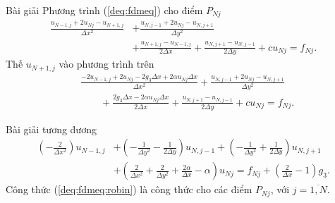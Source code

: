 \documentclass[9pt]{beamer}
\numberwithin{equation}{section}
\begin{document}
\begin{frame}
\begin{exampleblock}{Bài giải}
    Phương trình (\ref{deq:fdmeq}) cho điểm $P_{Nj}$
    \begin{align*}
        \frac{u_{N-1,j} + 2u_{Nj} - u_{N+1,j}}{\Delta x^2} &+
        \frac{u_{N,j-1} + 2u_{Nj} - u_{N,j+1}}{\Delta y^2} \\&+
        \frac{u_{N+1,j} - u_{N-1,j}}{2 \Delta x} +
        \frac{u_{N,j+1} - u_{N,j-1}}{2 \Delta y} +
        c u_{Nj} = f_{Nj}.
    \end{align*}
    Thế $u_{N+1,j}$ vào phương trình trên
    \begin{align*}
        &\frac{-2u_{N-1,j} + 2u_{Nj} - 2g_3 \Delta x + 2\alpha u_{Nj} \Delta x}{\Delta x^2} + \frac{u_{N,j-1} + 2u_{Nj} - u_{N,j+1}}{\Delta y^2} \\&\quad\quad +
        \frac{2g_3\Delta x - 2\alpha u_{Nj}\Delta x}{2\Delta x} +
        \frac{u_{N,j+1} - u_{N,j-1}}{2 \Delta y} +
        c u_{Nj} = f_{Nj}.
    \end{align*}
\end{exampleblock}
\end{frame}

\begin{frame}
\begin{exampleblock}{Bài giải}
    tương đương
    \begin{align}
        \left(-\frac{2}{\Delta x^2}\right) u_{N-1,j} &+
        \left(-\frac{1}{\Delta y^2} - \frac{1}{2\Delta y}\right) u_{N,j-1} +
        \left(-\frac{1}{\Delta y^2} + \frac{1}{2\Delta y}\right) u_{N,j+1} \nonumber \\ &+ 
        \left(\frac{2}{\Delta x^2} + \frac{2}{\Delta y^2} + \frac{2\alpha}{\Delta x} - \alpha\right) u_{Nj} =
        f_{Nj} + \left(\frac{2}{\Delta x} - 1\right) g_3. \label{deq:fdmeq:robin}
    \end{align}
    Công thức (\ref{deq:fdmeq:robin}) là công thức cho các điểm $P_{Nj}$, với $j = \overline{1,N}$.
\end{exampleblock}
\end{frame}
\end{document}
